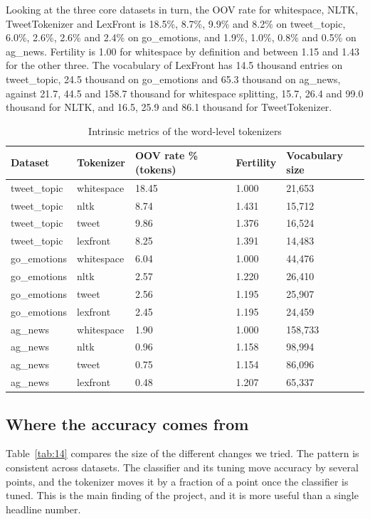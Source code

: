 \documentclass[journal,a4paper]{IEEEtran}
\begin{document}
Looking at the three core datasets in turn, the OOV rate for whitespace, NLTK, TweetTokenizer and LexFront is 18.5\%, 8.7\%, 9.9\% and 8.2\% on tweet\_topic, 6.0\%, 2.6\%, 2.6\% and 2.4\% on go\_emotions, and 1.9\%, 1.0\%, 0.8\% and 0.5\% on ag\_news. Fertility is 1.00 for whitespace by definition and between 1.15 and 1.43 for the other three. The vocabulary of LexFront has 14.5 thousand entries on tweet\_topic, 24.5 thousand on go\_emotions and 65.3 thousand on ag\_news, against 21.7, 44.5 and 158.7 thousand for whitespace splitting, 15.7, 26.4 and 99.0 thousand for NLTK, and 16.5, 25.9 and 86.1 thousand for TweetTokenizer.

\begin{table}[!tb]
\caption{Intrinsic metrics of the word-level tokenizers}\label{tab:4}
\centering
\scriptsize
\setlength{\tabcolsep}{3pt}
\begin{tabular}{lllll}
\toprule
\textbf{Dataset} & \textbf{Tokenizer} & \textbf{OOV rate \% (tokens)} & \textbf{Fertility} & \textbf{Vocabulary size} \\
\midrule
tweet\_topic & whitespace & 18.45 & 1.000 & 21,653 \\
tweet\_topic & nltk & 8.74 & 1.431 & 15,712 \\
tweet\_topic & tweet & 9.86 & 1.376 & 16,524 \\
tweet\_topic & lexfront & 8.25 & 1.391 & 14,483 \\
go\_emotions & whitespace & 6.04 & 1.000 & 44,476 \\
go\_emotions & nltk & 2.57 & 1.220 & 26,410 \\
go\_emotions & tweet & 2.56 & 1.195 & 25,907 \\
go\_emotions & lexfront & 2.45 & 1.195 & 24,459 \\
ag\_news & whitespace & 1.90 & 1.000 & 158,733 \\
ag\_news & nltk & 0.96 & 1.158 & 98,994 \\
ag\_news & tweet & 0.75 & 1.154 & 86,096 \\
ag\_news & lexfront & 0.48 & 1.207 & 65,337 \\
\bottomrule
\end{tabular}
\end{table}

\subsection{Where the accuracy comes from}\label{sec:5.5}
Table~\ref{tab:14} compares the size of the different changes we tried. The pattern is consistent across datasets. The classifier and its tuning move accuracy by several points, and the tokenizer moves it by a fraction of a point once the classifier is tuned. This is the main finding of the project, and it is more useful than a single headline number.
\end{document}
